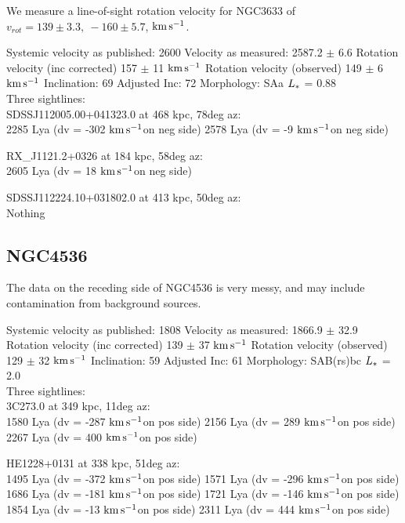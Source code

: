 \documentclass[iop]{emulateapj-rtx4}
\newcommand{\kms}{$\rm km\, s^{-1}$}
\begin{document}
We measure a line-of-sight rotation velocity for NGC3633 of $v_{rot}=139\pm 3.3,~-160\pm5.7$,  \kms.


Systemic velocity as published: 2600
Velocity as measured: 2587.2 $\pm$ 6.6
Rotation velocity (inc corrected) 157 $\pm$ 11 \kms
Rotation velocity (observed) 149 $\pm$ 6 \kms
Inclination: 69
Adjusted Inc: 72
Morphology: SAa
$L_{\**}$ = 0.88 \\

Three sightlines: \\
SDSSJ112005.00+041323.0 at 468 kpc, 78deg az: \\
2285 Lya (dv = -302 \kms on neg side)
2578 Lya (dv = -9 \kms on neg side)


RX\_J1121.2+0326 at 184 kpc, 58deg az: \\
2605 Lya (dv = 18 \kms on neg side)


SDSSJ112224.10+031802.0 at 413 kpc, 50deg az: \\
Nothing


\subsection{NGC4536}
The data on the receding side of NGC4536 is very messy, and may include contamination from background sources. 



Systemic velocity as published: 1808
Velocity as measured: 1866.9 $\pm$ 32.9
Rotation velocity (inc corrected) 139 $\pm$ 37 \kms
Rotation velocity (observed) 129 $\pm$ 32 \kms
Inclination: 59
Adjusted Inc: 61
Morphology: SAB(rs)bc
$L_{\**}$ = 2.0 \\

Three sightlines: \\
3C273.0 at 349 kpc, 11deg az: \\
1580 Lya (dv = -287 \kms on pos side)
2156 Lya (dv = 289 \kms on pos side)
2267 Lya (dv = 400 \kms on pos side)


HE1228+0131 at 338 kpc, 51deg az: \\
1495 Lya (dv = -372 \kms on pos side)
1571 Lya (dv = -296 \kms on pos side)
1686 Lya (dv = -181 \kms on pos side)
1721 Lya (dv = -146 \kms on pos side)
1854 Lya (dv = -13 \kms on pos side)
2311 Lya (dv = 444 \kms on pos side)
\end{document}
